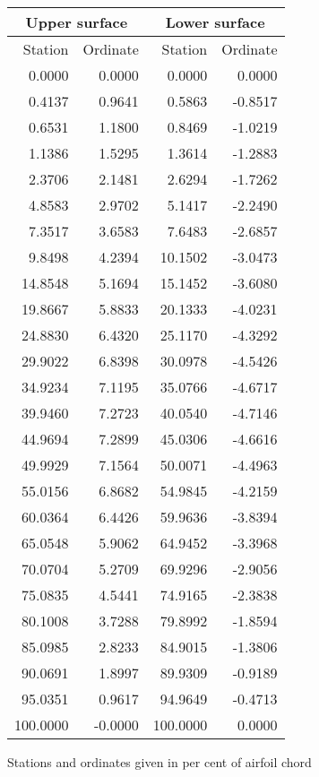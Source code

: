 \documentclass[11pt]{book}
\begin{document}
 \hspace{4mm}
 \begin{tabular}{|r|r|r|r|} \hline 
 \multicolumn{2}{|c|}{Upper surface} & \multicolumn{2}{|c|}{Lower surface} \\
 \hline
 Station & Ordinate & Station & Ordinate \\
 \hline
0.0000 & 0.0000 & 0.0000 & 0.0000 \\
0.4137 & 0.9641 & 0.5863 & -0.8517 \\
0.6531 & 1.1800 & 0.8469 & -1.0219 \\
1.1386 & 1.5295 & 1.3614 & -1.2883 \\
2.3706 & 2.1481 & 2.6294 & -1.7262 \\
4.8583 & 2.9702 & 5.1417 & -2.2490 \\
7.3517 & 3.6583 & 7.6483 & -2.6857 \\
9.8498 & 4.2394 & 10.1502 & -3.0473 \\
14.8548 & 5.1694 & 15.1452 & -3.6080 \\
19.8667 & 5.8833 & 20.1333 & -4.0231 \\
24.8830 & 6.4320 & 25.1170 & -4.3292 \\
29.9022 & 6.8398 & 30.0978 & -4.5426 \\
34.9234 & 7.1195 & 35.0766 & -4.6717 \\
39.9460 & 7.2723 & 40.0540 & -4.7146 \\
44.9694 & 7.2899 & 45.0306 & -4.6616 \\
49.9929 & 7.1564 & 50.0071 & -4.4963 \\
55.0156 & 6.8682 & 54.9845 & -4.2159 \\
60.0364 & 6.4426 & 59.9636 & -3.8394 \\
65.0548 & 5.9062 & 64.9452 & -3.3968 \\
70.0704 & 5.2709 & 69.9296 & -2.9056 \\
75.0835 & 4.5441 & 74.9165 & -2.3838 \\
80.1008 & 3.7288 & 79.8992 & -1.8594 \\
85.0985 & 2.8233 & 84.9015 & -1.3806 \\
90.0691 & 1.8997 & 89.9309 & -0.9189 \\
95.0351 & 0.9617 & 94.9649 & -0.4713 \\
100.0000 & -0.0000 & 100.0000 & 0.0000 \\
 \hline 
 \end{tabular}
 \vspace{8mm}

Stations and ordinates given in per cent of airfoil chord
\end{document}
